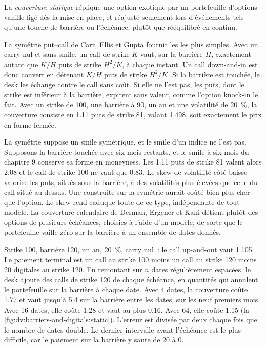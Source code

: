 \begin{definition}\label{def:dv:barriers-and-digitals:static}
La \emph{couverture statique} réplique une option exotique par un portefeuille d'options vanille figé dès
la mise en place, et réajusté seulement lors d'événements tels qu'une touche de barrière ou l'échéance, plutôt que rééquilibré en continu.
\end{definition}

La symétrie put--call de Carr, Ellis et Gupta fournit les  les plus simples. Avec un carry nul et sans smile, un call
de strike $K$ vaut, sur la barrière $H$, exactement autant que $K/H$ puts de strike $H^2/K$, à chaque instant. Un
call down-and-in est donc couvert en détenant $K/H$ puts de strike $H^2/K$. Si la barrière est touchée, le desk les échange contre
le call sans coût. Si elle ne l'est pas, les puts, dont le strike est inférieur à la barrière, expirent sans valeur, comme l'option knock-in le fait.
Avec un strike de 100, une barrière à 90, un an et une volatilité de 20~\%, la couverture consiste en 1.11 puts de strike 81, valant 1.498, soit exactement
le prix en forme fermée.

La symétrie suppose un smile symétrique, et le smile d'un indice ne l'est pas. Supposons la barrière touchée avec six mois
restants, et le smile à six mois du chapitre 9 conserve sa forme en moneyness. Les 1.11 puts de strike 81 valent alors 2.08 et
le call de strike 100 ne vaut que 0.83. Le skew de volatilité côté baisse valorise les puts, situés sous la barrière, à des
volatilités plus élevées que celle du call situé au-dessus. Une  construite sur la symétrie aurait coûté bien plus cher que l'option.
Le skew rend caduque toute  de ce type, indépendante de tout modèle. La couverture calendaire de Derman, Ergener et Kani détient plutôt
des options de plusieurs échéances, choisies à l'aide d'un modèle, de sorte que le portefeuille vaille zéro sur la barrière à un ensemble de
dates donnés.

\begin{example}\label{ex:dv:barriers-and-digitals:calendar}
Strike 100, barrière 120, un an, 20~\%, carry nul~: le call up-and-out vaut 1.105. Le paiement terminal est un call
au strike 100 moins un call au strike 120 moins 20 digitales au strike 120. En remontant sur $n$ dates régulièrement espacées, le desk ajoute des calls
de strike 120 de chaque échéance, en quantités qui annulent le portefeuille sur la barrière à chaque date. Avec 4 dates, la couverture
coûte 1.77 et vaut jusqu'à 5.4 sur la barrière entre les dates, sur les neuf premiers mois. Avec 16 dates, elle coûte 1.28
et vaut au plus 0.16. Avec 64, elle coûte 1.15 (la \cref{fig:dv:barriers-and-digitals:static}). L'erreur est divisée par deux chaque fois
que le nombre de dates double. Le dernier intervalle avant l'échéance est le plus difficile, car le paiement sur la barrière y saute de
20 à 0.
\end{example}

